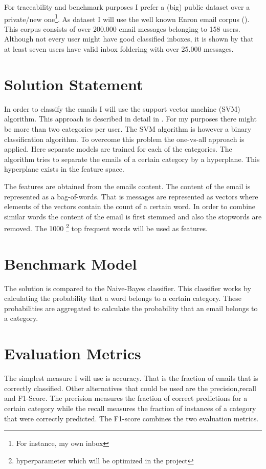 \documentclass{article}
\begin{document}
For traceability and benchmark purposes I prefer a (big) public dataset over a private/new one\footnote{For instance, my own inbox}. As dataset I will use the well known Enron email corpus (\cite{klimt2004enron}). This corpus consists of over 200.000 email messages belonging to 158 users. Although not every user might have good classified inboxes, it is shown by \cite{bekkerman2004ace} that at least seven users have valid inbox foldering with over 25.000 messages.

\section*{Solution Statement}

In order to classify the emails I will use the support vector machine (SVM) algorithm. This approach is described in detail in \cite{Joachims}. For my purposes there might be more than two categories per user. The SVM algorithm is however a binary classification algorithm. To overcome this problem the one-vs-all approach is applied. Here separate models are trained for each of the categories. The algorithm tries to separate the emails of a certain category by a hyperplane. This hyperplane exists in the feature space.

The features are obtained from the emails content. The content of the email is represented as a bag-of-words. That is messages are represented as vectors where elements of the vectors contain the count of a certain word. In order to combine similar words the content of the email is first stemmed and also the stopwords are removed. The 1000 \footnote{hyperparameter which will be optimized in the project} top frequent words will be used as features.

\section*{Benchmark Model}

The solution is compared to the Naive-Bayes classifier. This classifier works by calculating the probability that a word belongs to a certain category. These probabilities are aggregated to calculate the probability that an email belongs to a category. 

\section*{Evaluation Metrics}

The simplest measure I will use is accuracy. That is the fraction of emails that is correctly classified. Other alternatives that could be used are the precision,recall and F1-Score. The precision measures the fraction of correct predictions for a certain category while the recall measures the fraction of instances of a category that were correctly predicted. The F1-score combines the two evaluation metrics.
\end{document}
